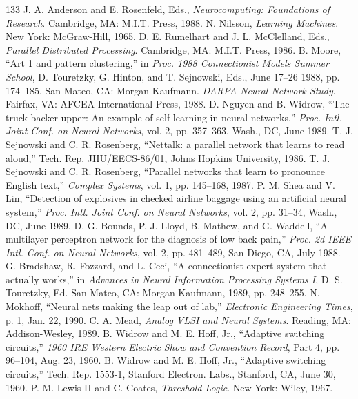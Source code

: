\documentclass[10pt,twocolumn]{article}
\begin{document}
\begin{thebibliography}{133}
 J. A. Anderson and E. Rosenfeld, Eds., \textit{Neurocomputing: Foundations of Research}. Cambridge, MA: M.I.T. Press, 1988.
 N. Nilsson, \textit{Learning Machines}. New York: McGraw-Hill, 1965.
 D. E. Rumelhart and J. L. McClelland, Eds., \textit{Parallel Distributed Processing}. Cambridge, MA: M.I.T. Press, 1986.
 B. Moore, ``Art 1 and pattern clustering,'' in \textit{Proc. 1988 Connectionist Models Summer School}, D. Touretzky, G. Hinton, and T. Sejnowski, Eds., June 17--26 1988, pp. 174--185, San Mateo, CA: Morgan Kaufmann.
 \textit{DARPA Neural Network Study}. Fairfax, VA: AFCEA International Press, 1988.
 D. Nguyen and B. Widrow, ``The truck backer-upper: An example of self-learning in neural networks,'' \textit{Proc. Intl. Joint Conf. on Neural Networks}, vol. 2, pp. 357--363, Wash., DC, June 1989.
 T. J. Sejnowski and C. R. Rosenberg, ``Nettalk: a parallel network that learns to read aloud,'' Tech. Rep. JHU/EECS-86/01, Johns Hopkins University, 1986.
 T. J. Sejnowski and C. R. Rosenberg, ``Parallel networks that learn to pronounce English text,'' \textit{Complex Systems}, vol. 1, pp. 145--168, 1987.
 P. M. Shea and V. Lin, ``Detection of explosives in checked airline baggage using an artificial neural system,'' \textit{Proc. Intl. Joint Conf. on Neural Networks}, vol. 2, pp. 31--34, Wash., DC, June 1989.
 D. G. Bounds, P. J. Lloyd, B. Mathew, and G. Waddell, ``A multilayer perceptron network for the diagnosis of low back pain,'' \textit{Proc. 2d IEEE Intl. Conf. on Neural Networks}, vol. 2, pp. 481--489, San Diego, CA, July 1988.
 G. Bradshaw, R. Fozzard, and L. Ceci, ``A connectionist expert system that actually works,'' in \textit{Advances in Neural Information Processing Systems I}, D. S. Touretzky, Ed. San Mateo, CA: Morgan Kaufmann, 1989, pp. 248--255.
 N. Mokhoff, ``Neural nets making the leap out of lab,'' \textit{Electronic Engineering Times}, p. 1, Jan. 22, 1990.
 C. A. Mead, \textit{Analog VLSI and Neural Systems}. Reading, MA: Addison-Wesley, 1989.
 B. Widrow and M. E. Hoff, Jr., ``Adaptive switching circuits,'' \textit{1960 IRE Western Electric Show and Convention Record}, Part 4, pp. 96--104, Aug. 23, 1960.
 B. Widrow and M. E. Hoff, Jr., ``Adaptive switching circuits,'' Tech. Rep. 1553-1, Stanford Electron. Labs., Stanford, CA, June 30, 1960.
 P. M. Lewis II and C. Coates, \textit{Threshold Logic}. New York: Wiley, 1967.

\end{thebibliography}
\end{document}
